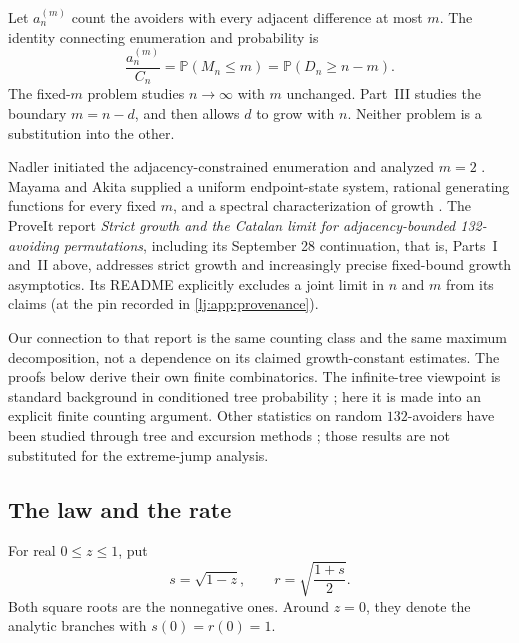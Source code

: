 \documentclass[11pt,a4paper]{article}
\theoremstyle{definition}\newaliascnt{definition}{theorem}
\theoremstyle{remark}\newaliascnt{remark}{theorem}
\newcommand{\ljP}{\mathbb P}
\begin{document}
Let $a_n^{(m)}$ count the avoiders with every adjacent difference at most
$m$. The identity connecting enumeration and probability is
\begin{equation}
 \frac{a_n^{(m)}}{C_n}=\ljP(M_n\le m)
 =\ljP(D_n\ge n-m).
 \label{lj:eq:bridge}
\end{equation}
The fixed-$m$ problem studies $n\to\infty$ with $m$ unchanged. Part~III
studies the boundary $m=n-d$, and then allows $d$ to grow with $n$.
Neither problem is a substitution into the other.

Nadler initiated the adjacency-constrained enumeration and analyzed $m=2$
\cite{Nadler}. Mayama and Akita supplied a uniform endpoint-state system,
rational generating functions for every fixed $m$, and a spectral
characterization of growth \cite{MayamaAkita}. The ProveIt report
\emph{Strict growth and the Catalan limit for adjacency-bounded
132-avoiding permutations}, including its September 28 continuation, that
is, Parts~I and~II above, addresses strict growth and increasingly precise
fixed-bound growth asymptotics. Its README explicitly excludes a joint limit
in $n$ and $m$ from its claims (at the pin recorded in
\cref{lj:app:provenance}).

Our connection to that report is the same counting class and the same
maximum decomposition, not a dependence on its claimed growth-constant
estimates. The proofs below derive their own finite combinatorics. The
infinite-tree viewpoint is standard background in conditioned tree
probability \cite{JansonTrees}; here it is made into an explicit finite
counting argument. Other statistics on random $132$-avoiders have been
studied through tree and excursion methods \cite{JansonPatterns}; those
results are not substituted for the extreme-jump analysis.

\subsection{The law and the rate}
For real $0\le z\le1$, put
\begin{equation}
 s=\sqrt{1-z},\qquad r=\sqrt{\frac{1+s}{2}}.
 \label{lj:eq:s-r}
\end{equation}
Both square roots are the nonnegative ones. Around $z=0$, they denote the
analytic branches with $s(0)=r(0)=1$.
\end{document}
